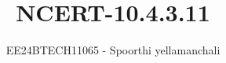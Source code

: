 \documentclass[journal]{IEEEtran}
\begin{document}

\vspace{3cm}

\title{NCERT-10.4.3.11}
\author{EE24BTECH11065 - Spoorthi yellamanchali
}
{\let\newpage\relax\maketitle}

\renewcommand{\thefigure}{\theenumi}
\renewcommand{\thetable}{\theenumi}
\setlength{\intextsep}{10pt} %


\renewcommand{\thetable}{\theenumi}
\end{document}
